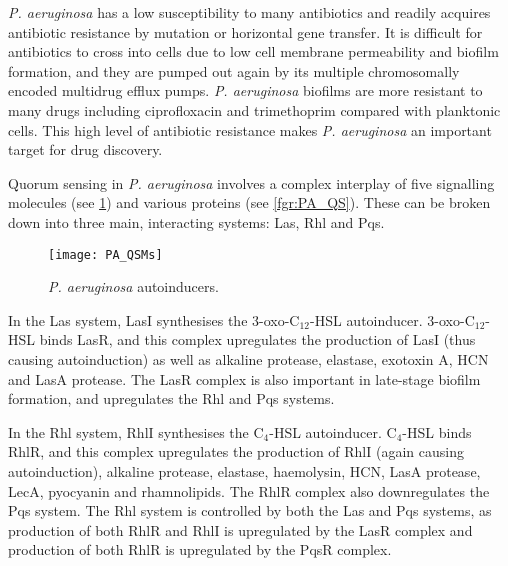 \textit{P. aeruginosa} has a low susceptibility to many antibiotics and readily acquires antibiotic resistance by mutation or horizontal gene transfer\cite{Cornelis2008}.
It is difficult for antibiotics to cross into cells due to low cell membrane permeability\cite{Nikaido1989} and biofilm formation\cite{Evans1991}, and they are pumped out again by its multiple chromosomally encoded multidrug efflux pumps\cite{Poole2004}.
\textit{P. aeruginosa} biofilms are more resistant to many drugs including ciprofloxacin  and trimethoprim  compared with planktonic cells\cite{Evans1991,Olson2002}.
This high level of antibiotic resistance makes \textit{P. aeruginosa} an important target for drug discovery.

Quorum sensing in \textit{P. aeruginosa} involves a complex interplay of five signalling molecules (see \ref{fgr:PA_autoinducers}) and various proteins (see \ref{fgr:PA_QS})\cite{Dubern2008,Hodgkinson2011,Jimenez2012}.
These can be broken down into three main, interacting systems: Las, Rhl and Pqs.

\begin{figure}[H]
	\begin{center}
		\texttt{[image: PA\_QSMs]}
		\caption{\textit{P. aeruginosa} autoinducers. \label{fgr:PA_autoinducers}}
	\end{center}
\end{figure}

In the Las system, LasI\cite{Wargo2007} synthesises the 3-oxo-C$_{12}$-HSL \cite{Pearson1994} autoinducer. 
3-oxo-C$_{12}$-HSL  binds LasR\cite{Gambello1991}, and this complex upregulates the production of LasI\cite{Pesci1997} (thus causing autoinduction) as well as 
alkaline protease\cite{Gambello1993}, elastase\cite{Gambello1991}, exotoxin A\cite{Gambello1993}, HCN\cite{Pessi2000} and LasA protease\cite{Toder1991}.
The LasR complex is also important in late-stage biofilm formation\cite{Sauer2002}, and upregulates the Rhl\cite{Latifi1996} and Pqs systems\cite{Gallagher2002,Wade2005}.

In the Rhl system, RhlI\cite{Brint1995} synthesises the C$_4$-HSL \cite{Pearson1995} autoinducer. 
C$_4$-HSL  binds RhlR\cite{Winson1995}, and this complex upregulates the production of RhlI\cite{Pesci1997} (again causing autoinduction), 
alkaline protease\cite{Latifi1995}, elastase\cite{Brint1995}, haemolysin\cite{Latifi1995}, HCN\cite{Pessi2000,Latifi1995}, LasA protease\cite{Brint1995}, LecA\cite{Winzer2000}, pyocyanin\cite{Brint1995,Latifi1995} and rhamnolipids\cite{Brint1995}.
The RhlR complex also downregulates the Pqs system\cite{McGrath2004,Wade2005}.
The Rhl system is controlled by both the Las and Pqs systems,
as production of both RhlR and RhlI is upregulated by the LasR complex\cite{Latifi1996} 
and production of both RhlR is upregulated by the PqsR complex\cite{McKnight2000}.


